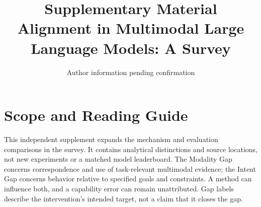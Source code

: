 \documentclass[10pt,onecolumn,journal,compsoc]{IEEEtran}
\title{Supplementary Material\\Alignment in Multimodal Large Language Models: A Survey}
\author{Author information pending confirmation}
\begin{document}
\maketitle
\section{Scope and Reading Guide}
This independent supplement expands the mechanism and evaluation comparisons in the survey. It contains analytical distinctions and source locations, not new experiments or a matched model leaderboard. The Modality Gap concerns correspondence and use of task-relevant multimodal evidence; the Intent Gap concerns behavior relative to specified goals and constraints. A method can influence both, and a capability error can remain unattributed. Gap labels describe the intervention's intended target, not a claim that it closes the gap.
\end{document}
